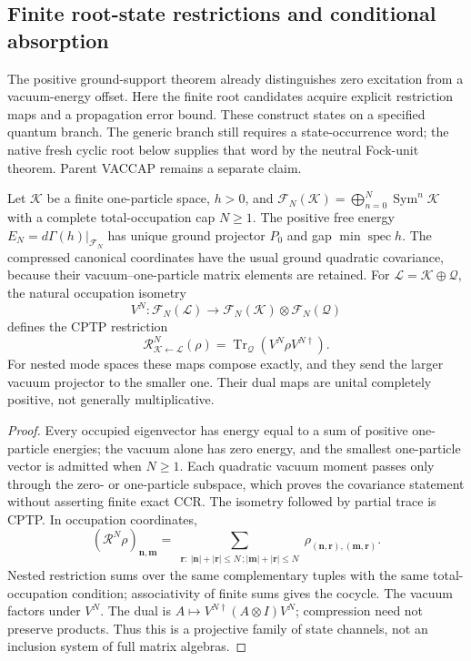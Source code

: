 \documentclass[12pt,a4paper]{article}
\begin{document}
\subsection{Finite root-state restrictions and conditional absorption}
\label{p4:sec:v2109-finite-root-state-transport}
The positive ground-support theorem already distinguishes zero excitation
from a vacuum-energy offset.  Here the finite root candidates acquire
explicit restriction maps and a propagation error bound.  These construct states on a specified quantum branch.  The generic branch still requires a state-occurrence word; the native fresh cyclic root below supplies that word by the neutral Fock-unit theorem.  Parent VACCAP remains a separate claim.

\begin{theorem}
\label{p4:thm:v2109-finite-root-restrictions}
Let \(\mathcal K\) be a finite one-particle space, \(h>0\), and
\(\mathcal F_N(\mathcal K)=\bigoplus_{n=0}^N\operatorname{Sym}^n\mathcal K\)
with a complete total-occupation cap \(N\ge1\).  The positive free energy
\(E_N=d\Gamma(h)|_{\mathcal F_N}\) has unique ground projector \(P_0\)
and gap \(\min\operatorname{spec}h\).  The compressed canonical
coordinates have the usual ground quadratic covariance, because their
vacuum--one-particle matrix elements are retained.
For \(\mathcal L=\mathcal K\oplus\mathcal Q\), the natural occupation
isometry
\[
 V^N:\mathcal F_N(\mathcal L)\longrightarrow
 \mathcal F_N(\mathcal K)\otimes\mathcal F_N(\mathcal Q)
\]
defines the CPTP restriction
\[
 \mathcal R^N_{\mathcal K\leftarrow\mathcal L}(\rho)
 =\operatorname{Tr}_{\mathcal Q}(V^N\rho V^{N\dagger}).
\]
For nested mode spaces these maps compose exactly, and they send the larger
vacuum projector to the smaller one.  Their dual maps are unital completely
positive, not generally multiplicative.
\end{theorem}
\begin{proof}
Every occupied eigenvector has energy equal to a sum of positive
one-particle energies; the vacuum alone has zero energy, and the smallest
one-particle vector is admitted when \(N\ge1\).  Each quadratic vacuum
moment passes only through the zero- or one-particle subspace, which proves
the covariance statement without asserting finite exact CCR.
The isometry followed by partial trace is CPTP.  In occupation coordinates,
\[
 (\mathcal R^N\rho)_{\mathbf n,\mathbf m}
 =\sum_{\substack{\mathbf r:\ |\mathbf n|+|\mathbf r|\le N\,;
 |\mathbf m|+|\mathbf r|\le N}}
 \rho_{(\mathbf n,\mathbf r),(\mathbf m,\mathbf r)}.
\]
Nested restriction sums over the same complementary tuples with the same
total-occupation condition; associativity of finite sums gives the cocycle.
The vacuum factors under \(V^N\).  The dual is
\(A\mapsto V^{N\dagger}(A\otimes I)V^N\); compression need not preserve
products.  Thus this is a projective family of state channels, not an
inclusion system of full matrix algebras.
\end{proof}
\end{document}

